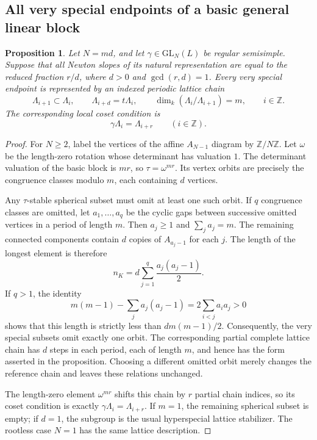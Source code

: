 \documentclass[11pt,a4paper]{article}
\newtheorem{proposition}[theorem]{Proposition}
\theoremstyle{definition}
\theoremstyle{remark}
\begin{document}
\subsection{All very special endpoints of a basic general linear block}

\begin{proposition}\label{prop:ac-gl-endpoints}
Let \(N=md\), and let \(\gamma\in\mathrm{GL}_N(L)\) be regular semisimple.
Suppose that all Newton slopes of its natural representation are equal to
the reduced fraction \(r/d\), where \(d>0\) and \(\gcd(r,d)=1\). Every very
special endpoint is represented by an indexed periodic lattice chain
\[
\Lambda_{i+1}\subset\Lambda_i,\qquad
\Lambda_{i+d}=t\Lambda_i,\qquad
\dim_k(\Lambda_i/\Lambda_{i+1})=m,\qquad i\in\mathbb Z.
\]
The corresponding local coset condition is
\[
\gamma\Lambda_i=\Lambda_{i+r}\qquad(i\in\mathbb Z).
\]
\end{proposition}

\begin{proof}
For \(N\geq2\), label the vertices of the affine \(A_{N-1}\) diagram by
\(\mathbb Z/N\mathbb Z\). Let \(\omega\) be the length-zero rotation whose
determinant has valuation \(1\). The determinant valuation of the basic
block is \(mr\), so \(\tau=\omega^{mr}\). Its vertex orbits are precisely
the congruence classes modulo \(m\), each containing \(d\) vertices.

Any \(\tau\)-stable spherical subset must omit at least one such orbit. If
\(q\) congruence classes are omitted, let \(a_1,\ldots,a_q\) be the cyclic
gaps between successive omitted vertices in a period of length \(m\).
Then \(a_j\geq1\) and \(\sum_j a_j=m\). The remaining connected components
contain \(d\) copies of \(A_{a_j-1}\) for each \(j\). The length of the
longest element is therefore
\[
n_K=d\sum_{j=1}^q\frac{a_j(a_j-1)}2.
\]
If \(q>1\), the identity
\[
m(m-1)-\sum_j a_j(a_j-1)
=2\sum_{i<j}a_i a_j>0
\]
shows that this length is strictly less than \(dm(m-1)/2\). Consequently,
the very special subsets omit exactly one orbit. The corresponding
partial complete lattice chain has \(d\) steps in each period, each of
length \(m\), and hence has the form asserted in the proposition. Choosing
a different omitted orbit merely changes the reference chain and leaves
these relations unchanged.

The length-zero element \(\omega^{mr}\) shifts this chain by \(r\) partial
chain indices, so its coset condition is exactly
\(\gamma\Lambda_i=\Lambda_{i+r}\). If \(m=1\), the remaining spherical
subset is empty; if \(d=1\), the subgroup is the usual hyperspecial
lattice stabilizer. The rootless case \(N=1\) has the same lattice
description.
\end{proof}
\end{document}
